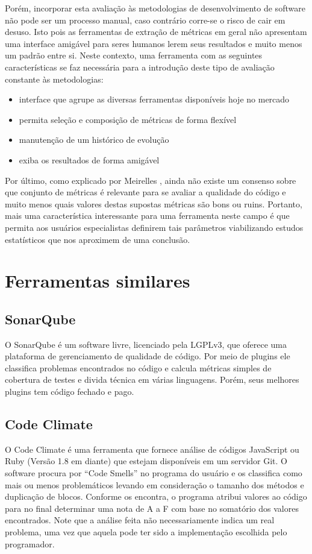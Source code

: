 \documentclass[12pt]{article}
\begin{document}
Porém, incorporar esta avaliação às metodologias de desenvolvimento de software não pode ser um processo manual, caso contrário corre-se o risco de cair em desuso. Isto pois as ferramentas de extração de métricas em geral não apresentam uma interface amigável para seres humanos lerem seus resultados e muito menos um padrão entre si.
Neste contexto, uma ferramenta com as seguintes características se faz necessária para a introdução deste tipo de avaliação constante às metodologias:
\begin{itemize}
  \item interface que agrupe as diversas ferramentas disponíveis hoje no mercado
  \item permita seleção e composição de métricas de forma flexível
  \item manutenção de um histórico de evolução
  \item exiba os resultados de forma amigável
\end{itemize}
Por último, como explicado por Meirelles \cite{m13}, ainda não existe um consenso sobre que conjunto de métricas é relevante para se avaliar a qualidade do código e muito menos quais valores destas supostas métricas são bons ou ruins. Portanto, mais uma característica interessante para uma ferramenta neste campo é que permita aos usuários especialistas definirem tais parâmetros viabilizando estudos estatísticos que nos aproximem de uma conclusão.
\section{Ferramentas similares}
  \subsection{SonarQube}
  O SonarQube é um software livre, licenciado pela LGPLv3, que oferece uma plataforma de gerenciamento de qualidade de código. Por meio de plugins ele classifica problemas encontrados no código e calcula métricas simples de cobertura de testes e divida técnica em várias linguagens. Porém, seus melhores plugins tem código fechado e pago.
  \subsection{Code Climate}
  O Code Climate é uma ferramenta que fornece análise de códigos JavaScript ou Ruby (Versão 1.8 em diante) que estejam disponíveis em um servidor Git.
  O software procura por ``Code Smells'' no programa do usuário e os classifica como mais ou menos problemáticos levando em consideração o tamanho dos métodos e duplicação de blocos. Conforme os encontra, o programa atribui valores ao código para no final determinar uma nota de A a F com base no somatório dos valores encontrados. Note que a análise feita não necessariamente indica um real problema, uma vez que aquela pode ter sido a implementação escolhida pelo programador.
\end{document}
